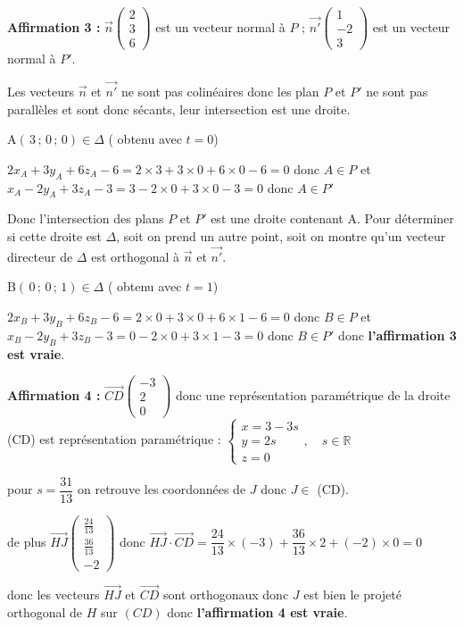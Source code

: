  

\textbf{Affirmation 3 :} $\overrightarrow{n} \begin{pmatrix}  2 \\  3  \\6 \end{pmatrix}$  est un vecteur normal à $P$ ; $\overrightarrow{n'} \begin{pmatrix}  1 \\  -2  \\3 \end{pmatrix}$  est un vecteur normal à $P'$.

Les vecteurs $\overrightarrow{n}$ et $\overrightarrow{n'}$ ne sont pas colinéaires donc les plan $P$ et $P'$ ne sont pas parallèles et sont donc sécants, leur intersection est une droite.

A$(\,3\,;\,0\,;\,0) \in \Delta$ ( obtenu avec $t=0$) 

$2x_A + 3y_A + 6z_A - 6 = 2 \times 3+3 \times0 + 6 \times 0 -6=  0 $ donc $A \in P$  et $x_A - 2y_A + 3z_A - 3 =3 - 2\times0 + 3\times0 - 3=0$ donc $A \in P'$

Donc l'intersection des plans \( P \) et \( P' \)  est une droite contenant A. Pour déterminer si cette droite est $\Delta$, soit on prend un autre point, soit on montre qu'un vecteur directeur de $\Delta$ est orthogonal à $\overrightarrow{n}$ et $\overrightarrow{n'}$.

B$(\,0\,;\,0\,;\,1) \in \Delta$ ( obtenu avec $t=1$) 

$2x_B + 3y_B + 6z_B - 6 = 2 \times 0+3 \times0 + 6 \times 1 -6=  0 $ donc $B \in P$  et $x_B - 2y_B + 3z_B - 3 =0 - 2\times0 + 3\times1 - 3=0$ donc $B\in P'$ 
donc \textbf{l'affirmation 3 est vraie}.

 

\textbf{Affirmation 4 :} $\overrightarrow{CD} \begin{pmatrix} -3 \\2\\0 \end{pmatrix}$ donc une représentation paramétrique de la droite (CD) est représentation paramétrique : $ \left\{
    \begin{array}{l}
    x = 3-3s\\
    y = 2s \\
    z = 0
    \end{array},\quad s \in \mathbb{R}
    \right.$

pour $s=\dfrac{31}{13}$ on retrouve les coordonnées de $J$ donc $J \in$ (CD).

de plus $\overrightarrow{HJ} \begin{pmatrix} \frac{24}{13} \\ \frac{36}{13} \\ -2   \end{pmatrix}$ donc  $\overrightarrow{HJ} \cdot \overrightarrow{CD} = \dfrac{24}{13} \times (-3) + \dfrac{36}{13} \times 2 + (-2) \times 0 = 0$

donc les vecteurs $\overrightarrow{HJ}$ et $\overrightarrow{CD}$ sont orthogonaux donc  \( J \) est bien le projeté orthogonal de \( H \) sur \( (CD) \) donc \textbf{l'affirmation 4 est vraie}.

\bigskip
